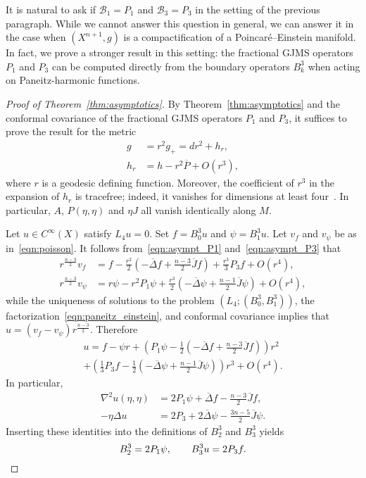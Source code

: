 \documentclass{amsart}
\theoremstyle{definition}
\theoremstyle{remark}
\numberwithin{equation}{section}
\begin{document}
It is natural to ask if ${\mathcal{B}}_1=P_1$ and ${\mathcal{B}}_3=P_3$ in the setting of the previous paragraph.  While we cannot answer this question in general, we can answer it in the case when $(X^{n+1},g)$ is a compactification of a Poincar\'e--Einstein manifold.  In fact, we prove a stronger result in this setting: the fractional GJMS operators $P_1$ and $P_3$ can be computed directly from the boundary operators $B_k^3$ when acting on Paneitz-harmonic functions.

\begin{proof}[Proof of Theorem~\ref{thm:asymptotics}]
 By Theorem~\ref{thm:asymptotics} and the conformal covariance of the fractional GJMS operators $P_1$ and $P_3$, it suffices to prove the result for the metric
 \begin{align*}
  g & = r^2g_+ = dr^2 + h_r, \\
  h_r & = h - r^2{\overline{P}} + O(r^3) ,
 \end{align*}
 where $r$ is a geodesic defining function.  Moreover, the coefficient of $r^3$ in the expansion of $h_r$ is tracefree; indeed, it vanishes for dimensions at least four~\cite{FeffermanGraham2012}.  In particular, $A$, $P(\eta,\eta)$ and $\eta J$ all vanish identically along $M$.
 
 Let $u\in C^\infty(X)$ satisfy $L_4u=0$.  Set $f=B_0^3u$ and $\psi=B_1^3u$.  Let $v_f$ and $v_\psi$ be as in~\eqref{eqn:poisson}.  It follows from~\eqref{eqn:asympt_P1} and~\eqref{eqn:asympt_P3} that
 \begin{align*}
  r^{\frac{n-3}{2}}v_f & = f - \frac{r^2}{2}\left(-{\overline{\Delta}} f + \frac{n-3}{2}{\overline{J}} f\right) + \frac{r^3}{3}P_3f + O(r^4) , \\
  r^{\frac{n-3}{2}}v_\psi & = r\psi - r^2P_1\psi + \frac{r^3}{2}\left(-{\overline{\Delta}}\psi + \frac{n-1}{2}{\overline{J}}\psi \right) + O(r^4) ,
 \end{align*}
 while the uniqueness of solutions to the problem $(L_4;(B_0^3,B_1^3))$, the factorization~\eqref{eqn:paneitz_einstein}, and conformal covariance implies that $u=\left(v_f-v_\psi\right)r^{\frac{n-3}{2}}$.  Therefore
 \begin{multline*}
  u = f - \psi r + \left(P_1\psi - \frac{1}{2}\left(-{\overline{\Delta}} f + \frac{n-3}{2}{\overline{J}} f\right)\right)r^2 \\ + \left(\frac{1}{3}P_3f  - \frac{1}{2}\left(-{\overline{\Delta}}\psi + \frac{n-1}{2}{\overline{J}}\psi\right)\right)r^3 + O(r^4) .
 \end{multline*}
 In particular,
 \begin{align*}
  \nabla^2u(\eta,\eta) & = 2P_1\psi + {\overline{\Delta}} f - \frac{n-3}{2}{\overline{J}} f, \\
  -\eta\Delta u & = 2P_3 + 2{\overline{\Delta}}\psi - \frac{3n-5}{2}{\overline{J}}\psi .
 \end{align*}
 Inserting these identities into the definitions of $B_2^3$ and $B_3^3$ yields
 \[ B_2^3 = 2P_1\psi, \qquad B_3^3u = 2P_3f . \qedhere \]
\end{proof}
\end{document}
